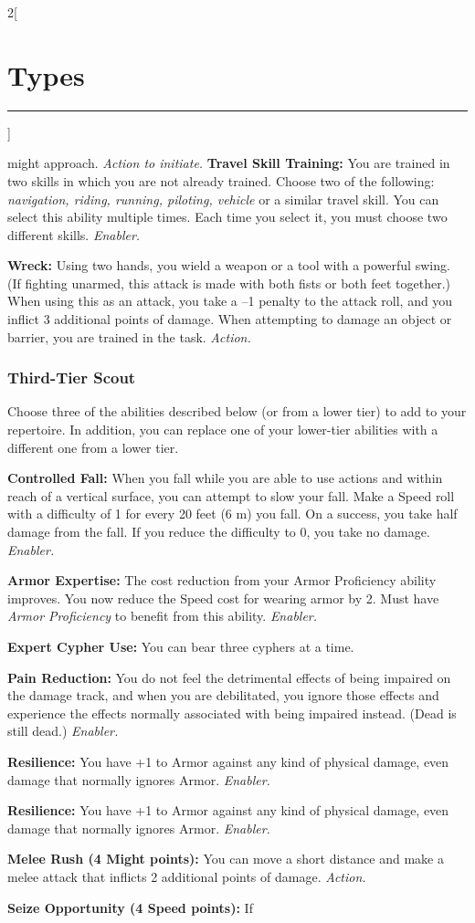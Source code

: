 \documentclass[a4paper,10pt,final]{book}
\newcommand{\HRule}{\rule{\linewidth}{0.5mm}} %
\newcommand{\newSection}[1]{\section*{#1} \addcontentsline{toc}{section}{#1} \label{sec:#1} \HRule}
\newcommand{\itemAbility}[2]{\textcolor{25gray}{\textbullet\textbf{ #1:}} {#2}\par}
\newcommand{\enabler}{\textit{ Enabler.}}
\newcommand{\action}{\textit{ Action.}}
\newcommand{\actionInit}{\textit{ Action to initiate.}}
\newenvironment{docsection}[1]
{
  \begin{multicols*}{2}[\newSection{#1}]
}
{
  \end{multicols*}
  \newpage
}
\begin{document}
\begin{docsection}{Types}
{might approach.\actionInit}
\itemAbility{Travel Skill Training}{You are trained in two skills in
which you are not already trained. Choose two
of the following: \textit{navigation, riding, running, piloting, vehicle} or a similar travel skill. You can select this
ability multiple times. Each time you select it,
you must choose two different skills.\enabler}
\itemAbility{Wreck}{Using two hands, you wield a
weapon or a tool with a powerful swing. (If
fighting unarmed, this attack is made with
both fists or both feet together.) When using
this as an attack, you take a –1 penalty to the
attack roll, and you inflict 3 additional points
of damage. When attempting to damage an
object or barrier, you are trained in the task.
\action}

\subsubsection*{Third-Tier Scout}
\label{subsub:scoutThirdTier}
Choose three of the abilities described
below (or from a lower tier) to add to your
repertoire. In addition, you can replace one
of your lower-tier abilities with a different
one from a lower tier.\par
\itemAbility{Controlled Fall}{When you fall while you
are able to use actions and within reach of
a vertical surface, you can attempt to slow
your fall. Make a Speed roll with a difficulty
of 1 for every 20 feet (6 m) you fall. On a
success, you take half damage from the fall.
If you reduce the difficulty to 0, you take no
damage.\enabler}
\itemAbility{Armor Expertise}{The cost
reduction from your Armor Proficiency
ability improves. You now reduce the Speed
cost for wearing armor by 2. Must have \textit{Armor Proficiency} to benefit from this ability.\enabler}
\itemAbility{Expert Cypher Use}{You can bear three
cyphers at a time.}
\itemAbility{Pain Reduction}{You do not feel the
detrimental effects of being impaired on the
damage track, and when you are debilitated,
you ignore those effects and experience
the effects normally associated with being
impaired instead. (Dead is still dead.)\enabler}
\itemAbility{Resilience}{You have +1 to Armor against
any kind of physical damage, even damage
that normally ignores Armor.\enabler}
\itemAbility{Resilience}{You have +1 to Armor against
any kind of physical damage, even damage
that normally ignores Armor.\enabler}
\itemAbility{Melee Rush (4 Might points)}{You can
move a short distance and make a melee
attack that inflicts 2 additional points of
damage.\action}
\itemAbility{Seize Opportunity (4 Speed points)}{If
}
\end{docsection}
\end{document}
